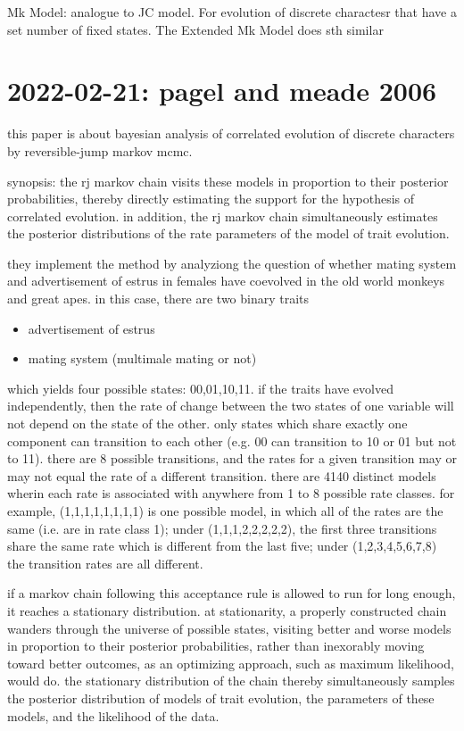 \documentclass{article}
\begin{document}
Mk Model: analogue to JC model. For evolution of discrete charactesr that have a
set number of fixed states. The Extended Mk Model does sth similar

\section{2022-02-21: pagel and meade 2006}
this paper is about bayesian analysis of correlated evolution of discrete
characters by reversible-jump markov mcmc.

synopsis: the rj markov chain visits these models in proportion to their
posterior probabilities, thereby directly estimating the support for the
hypothesis of correlated evolution. in addition, the rj markov chain
simultaneously estimates the posterior distributions of the rate parameters of
the model of trait evolution.

they implement the method by analyziong the question of whether mating system
and advertisement of estrus in females have coevolved in the old world monkeys
and great apes. in this case, there are two binary traits
\begin{itemize}
\item advertisement of estrus
\item mating system (multimale mating or not)
\end{itemize} 
which yields four possible states: 00,01,10,11. if the traits have evolved
independently, then the rate of change between the two states of one variable
will not depend on the state of the other. only states which share exactly one
component can transition to each other (e.g. 00 can transition to 10 or 01 but
not to 11). there are 8 possible transitions, and the rates for a given
transition may or may not equal the rate of a different transition. there are
4140 distinct models wherin each rate is associated with anywhere from 1 to 8
possible rate classes. for example, (1,1,1,1,1,1,1,1) is one possible model, in
which all of the rates are the same (i.e. are in rate class 1); under
(1,1,1,2,2,2,2,2), the first three transitions share the same rate which is
different from the last five; under (1,2,3,4,5,6,7,8) the transition rates are
all different.

if a markov chain following this acceptance rule is allowed to run for long
enough, it reaches a stationary distribution. at stationarity, a properly
constructed chain wanders through the universe of possible states, visiting
better and worse models in proportion to their posterior probabilities, rather
than inexorably moving toward better outcomes, as an optimizing approach, such
as maximum likelihood, would do. the stationary distribution of the chain
thereby simultaneously samples the posterior distribution of models of trait
evolution, the parameters of these models, and the likelihood of the data.
  
\end{document}
